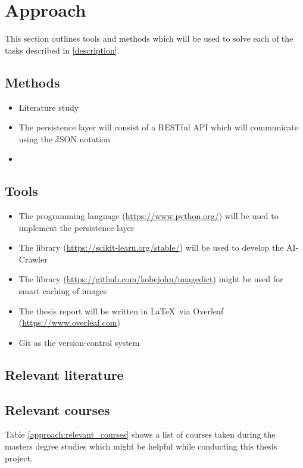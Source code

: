 \section{Approach}

This section outlines tools and methods which will be used to solve each of the tasks described in \ref{description}.

\subsection{Methods}
\begin{itemize}
    \item Literature study
    \item The persistence layer will consist of a RESTful API which will communicate using the JSON notation
    \item {}
\end{itemize}

\subsection{Tools}
 
\begin{itemize}
    \item The \Python programming language (\url{https://www.python.org/}) will be used to implement the persistence layer
    \item The \Python library \scikit (\url{https://scikit-learn.org/stable/}) will be used to develop the AI-Crawler
    \item The \Python library \ImageDict (\url{https://github.com/kobejohn/imagedict}) might be used for smart caching of images
    \item The thesis report will be written in \LaTeX ~via Overleaf (\url{https://www.overleaf.com})
    \item Git as the version-control system
\end{itemize}

\subsection{Relevant literature}

\subsection{Relevant courses}
Table \ref{approach:relevant_courses} shows a list of courses taken during the masters degree studies which might be helpful while conducting this thesis project.

